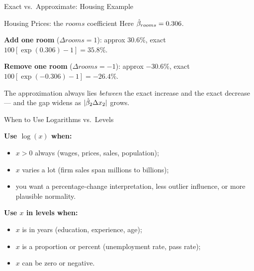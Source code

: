 \documentclass[aspectratio=169, 12pt]{beamer}
\begin{document}
\begin{frame}{Exact vs.\ Approximate: Housing Example}

  \begin{examplebox}{Housing Prices: the $rooms$ coefficient}
    Here $\hat{\beta}_{rooms} = 0.306$.

    \smallskip
    \textbf{Add one room} ($\Delta rooms = 1$): approx $30.6\%$, exact
    $100[\exp(0.306) - 1] = 35.8\%$.

    \smallskip
    \textbf{Remove one room} ($\Delta rooms = -1$): approx $-30.6\%$, exact
    $100[\exp(-0.306) - 1] = -26.4\%$.
  \end{examplebox}

  \medskip

  \begin{keybox}
    The approximation always lies \emph{between} the exact increase and the exact
    decrease --- and the gap widens as $|\hat{\beta}_2\Delta x_2|$ grows.
  \end{keybox}

\end{frame}

\begin{frame}{When to Use Logarithms vs.\ Levels}

  \textbf{Use $\log(x)$ when:}
  \begin{itemize}
    \item $x > 0$ always (wages, prices, sales, population);
    \item $x$ varies a lot (firm sales span millions to billions);
    \item you want a percentage-change interpretation, less outlier influence, or more
      plausible normality.
  \end{itemize}

  \medskip

  \textbf{Use $x$ in levels when:}
  \begin{itemize}
    \item $x$ is in years (education, experience, age);
    \item $x$ is a proportion or percent (unemployment rate, pass rate);
    \item $x$ can be zero or negative.
  \end{itemize}

\end{frame}
\end{document}
